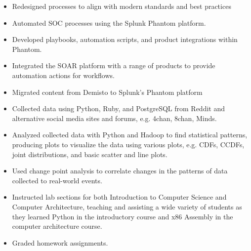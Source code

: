 \documentclass[10pt]{setzerresume}
\begin{document}

  \begin{itemize}[nosep]
    \item Redesigned processes to align with modern standards and best practices
    \item Automated SOC processes using the Splunk Phantom platform.
    \item Developed playbooks, automation scripts, and product integrations within Phantom.
    \item Integrated the SOAR platform with a range of products to provide automation actions for workflows.
    \item Migrated content from Demisto to Splunk's Phantom platform
  \end{itemize}



  \begin{itemize}[nosep]%
    \item Collected data using Python, Ruby, and PostgreSQL from Reddit and alternative social media sites and forums, e.g. 4chan, 8chan, Minds.
    \item Analyzed collected data with Python and Hadoop to find statistical patterns, producing plots to visualize the data using various plots, e.g. CDFs, CCDFs, joint distributions, and basic scatter and line plots.
    \item Used change point analysis to correlate changes in the patterns of data collected to real-world events.
    \item Instructed lab sections for both Introduction to Computer Science and Computer Architecture, teaching and assisting a wide variety of students as they learned Python in the introductory course and x86 Assembly in the computer architecture course.
    \item Graded homework assignments.
  \end{itemize}


\end{document}
